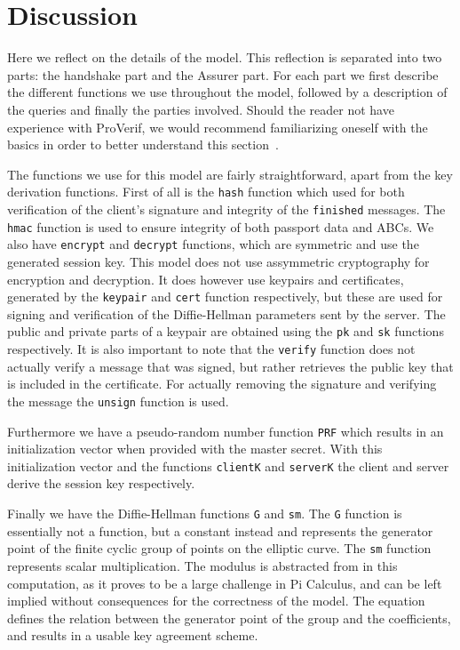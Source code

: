 \section{Discussion}
Here we reflect on the details of the model. This reflection is separated into two parts: the handshake part and the Assurer part. For each part we first describe the different functions we use throughout the model, followed by a description of the queries and finally the parties involved. Should the reader not have experience with ProVerif, we would recommend familiarizing oneself with the basics in order to better understand this section~\cite{proverifmanual}.

The functions we use for this model are fairly straightforward, apart from the key derivation functions. First of all is the \texttt{hash} function which used for both verification of the client's signature and integrity of the \texttt{finished} messages. The \texttt{hmac} function is used to ensure integrity of both passport data and ABCs. We also have \texttt{encrypt} and \texttt{decrypt} functions, which are symmetric and use the generated session key. This model does not use assymmetric cryptography for encryption and decryption. It does however use keypairs and certificates, generated by the \texttt{keypair} and \texttt{cert} function respectively, but these are used for signing and verification of the Diffie-Hellman parameters sent by the server. The public and private parts of a keypair are obtained using the \texttt{pk} and \texttt{sk} functions respectively. It is also important to note that the \texttt{verify} function does not actually verify a message that was signed, but rather retrieves the public key that is included in the certificate. For actually removing the signature and verifying the message the \texttt{unsign} function is used.

Furthermore we have a pseudo-random number function \texttt{PRF} which results in an initialization vector when provided with the master secret. With this initialization vector and the functions \texttt{clientK} and \texttt{serverK} the client and server derive the session key respectively. 

Finally we have the Diffie-Hellman functions \texttt{G} and \texttt{sm}. The \texttt{G} function is essentially not a function, but a constant instead and represents the generator point of the finite cyclic group of points on the elliptic curve. The \texttt{sm} function represents scalar multiplication. The modulus is abstracted from in this computation, as it proves to be a large challenge in Pi Calculus, and can be left implied without consequences for the correctness of the model. The equation defines the relation between the generator point of the group and the coefficients, and results in a usable key agreement scheme.

